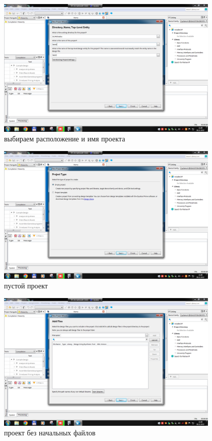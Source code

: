 \documentclass[a4paper]{article}
\begin{document}
  \begin{figure}[H]
    \centering
    \includegraphics[width=0.95\textwidth]{02_03}
    \caption{выбираем расположение и имя проекта}
  \end{figure}

  \begin{figure}[H]
    \centering
    \includegraphics[width=0.95\textwidth]{02_04}
    \caption{пустой проект}
  \end{figure}

  \begin{figure}[H]
    \centering
    \includegraphics[width=0.95\textwidth]{02_05}
    \caption{проект без начальных файлов}
  \end{figure}
\end{document}

